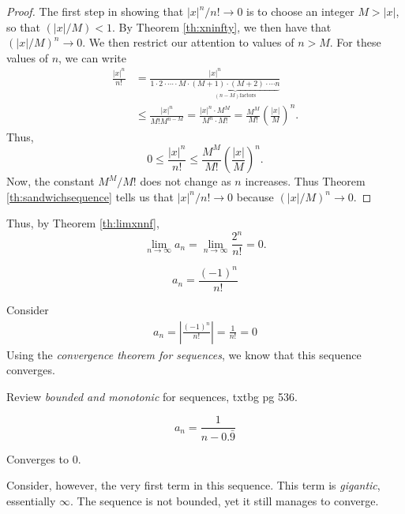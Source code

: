 \begin{ex}
\begin{sol}
\begin{theorem}
\begin{proof}
      The first step in showing that $|x|^n/n! \to 0$ is to choose an integer $M
      > |x|$, so that $(|x|/M) < 1$. By Theorem \ref{th:xninfty}, we then have
      that $\left( |x|/M \right)^n \to 0$. We then restrict our attention to
      values of $n > M$. For these values of $n$, we can write
      \begin{align*}
        \frac{|x|^n}{n!}&=
        \frac{|x|^n}{1\cdot2\cdot\cdots\cdot M
          \cdot\underbrace{(M+1)\cdot(M+2)\cdot\cdots n}_{(n-M) \text{
          factors}}}
          \\
          &\leq \frac{|x|^n}{M!M^{n-M}}=\frac{|x|^n \cdot M^M}{M^n \cdot M!} =
          \frac{M^M}{M!} \left( \frac{|x|}{M} \right)^n .
      \end{align*}
      Thus,
      \[ 0 \leq \frac{|x|^n}{n!}\leq \frac{M^M}{M!}\left( \frac{|x|}{M}
        \right)^n .\]
        Now, the constant $M^M / M!$ does not change as $n$ increases. Thus
        Theorem \ref{th:sandwichsequence} tells us that $|x|^n/n! \to 0$ because
        $(|x|/M)^n \to 0$.\cite[p.~AP-22]{thomas}
      \end{proof}
    \end{theorem}
    Thus, by Theorem \ref{th:limxnnf}, \[\lim_{n \to \infty} a_n =
      \lim_{n\to\infty}\frac{2^n}{n!}=0.\]
  \end{sol}
\end{ex}
\begin{ex}
  \[ a_n = \frac{(-1)^n}{n!} \]
  \begin{sol}
    Consider
    \begin{align*}
      a_n = \left| \frac{(-1)^n}{n!} \right| = \frac{1}{n!} = 0
    \end{align*}
    Using the \emph{convergence theorem for sequences}, we know that this sequence converges.
    \begin{remark}
      Review \emph{bounded and monotonic} for sequences, txtbg pg 536.
    \end{remark}
  \end{sol}
\end{ex}
\begin{ex}
  \[ a_n = \frac{1}{n-0.\bar{9}} \]
  \begin{sol}
    Converges to \(0\).

    Consider, however, the very first term in this sequence.
    This term is \emph{gigantic}, essentially \(\infty\).
    The sequence is not bounded, yet it still manages to converge.
  \end{sol}
\end{ex}

